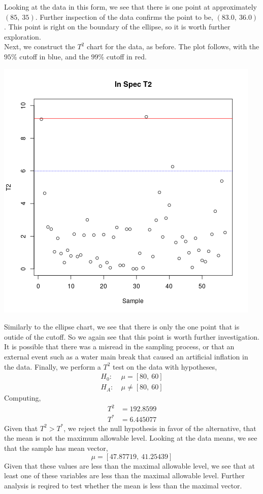 \documentclass[letterpaper,10pt]{article}
\begin{document}
\begin{enumerate}
\begin{center}
\end{center}
Looking at the data in this form, we see that there is one point at approximately $(85,\ 35)$. Further inspection of the data confirms the point to be, $(83.0,\ 36.0)$. This point is right on the boundary of the ellipse, so it is worth further exploration.\\
Next, we construct the $T^2$ chart for the data, as before. The plot follows, with the $95\%$ cutoff in blue, and the $99\%$ cutoff in red. 
\begin{center}
\includegraphics[scale=.75]{watert.png}
\end{center}
Similarly to the ellipse chart, we see that there is only the one point that is outide of the cutoff. So we again see that this point is worth further investigation. It is possible that there was a misread in the sampling process, or that an external event such as a water main break that caused an artificial inflation in the data. Finally, we perform a $T^2$ test on the data with hypotheses,
\begin{align*}
H_0:\ & \mu=[80,\ 60]\\
H_A:\ & \mu\neq [80,\ 60]
\end{align*}
Computing,
\begin{align*}
T^2 &= 192.8599\\
T^* &= 6.445077
\end{align*}
Given that $T^2>T^*$, we reject the null hypothesis in favor of the alternative, that the mean is not the maximum allowable level. Looking at the data means, we see that the sample has mean vector,
\[\mu=[47.87719,\ 41.25439]\]
Given that these values are less than the maximal allowable level, we see that at least one of these variables are less than the maximal allowable level. Further analysis is reqired to test whether the mean is less than the maximal vector.
\end{enumerate}
\end{document}
